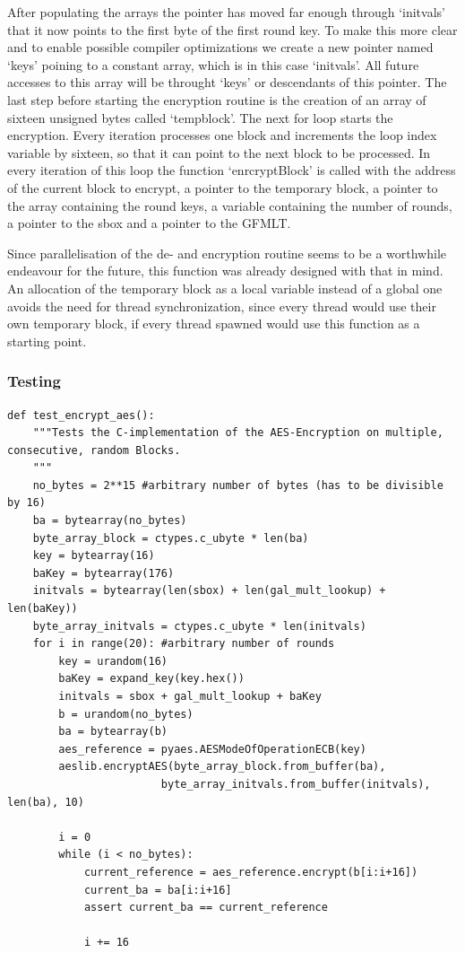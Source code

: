 After populating the arrays the pointer has moved far enough through
`initvals' that it now points to the first byte of the first round key.
To make this more clear and to enable possible compiler optimizations we
create a new pointer named `keys' poining to a constant array, which is
in this case `initvals'. All future accesses to this array will be
throught `keys' or descendants of this pointer. The last step before
starting the encryption routine is the creation of an array of sixteen
unsigned bytes called `tempblock'. The next for loop starts the
encryption. Every iteration processes one block and increments the loop
index variable by sixteen, so that it can point to the next block to be
processed. In every iteration of this loop the function `enrcryptBlock'
is called with the address of the current block to encrypt, a pointer to
the temporary block, a pointer to the array containing the round keys, a
variable containing the number of rounds, a pointer to the sbox and a
pointer to the GFMLT.

Since parallelisation of the de- and encryption routine seems to be a
worthwhile endeavour for the future, this function was already designed
with that in mind. An allocation of the temporary block as a local
variable instead of a global one avoids the need for thread
synchronization, since every thread would use their own temporary block,
if every thread spawned would use this function as a starting point.

\hypertarget{testing-6}{%
\subsubsection{Testing}\label{testing-6}}

\begin{lstlisting}
def test_encrypt_aes():
    """Tests the C-implementation of the AES-Encryption on multiple, consecutive, random Blocks.
    """
    no_bytes = 2**15 #arbitrary number of bytes (has to be divisible by 16)
    ba = bytearray(no_bytes)
    byte_array_block = ctypes.c_ubyte * len(ba)
    key = bytearray(16)
    baKey = bytearray(176)
    initvals = bytearray(len(sbox) + len(gal_mult_lookup) + len(baKey))
    byte_array_initvals = ctypes.c_ubyte * len(initvals)
    for i in range(20): #arbitrary number of rounds
        key = urandom(16)
        baKey = expand_key(key.hex())
        initvals = sbox + gal_mult_lookup + baKey
        b = urandom(no_bytes)
        ba = bytearray(b)
        aes_reference = pyaes.AESModeOfOperationECB(key)
        aeslib.encryptAES(byte_array_block.from_buffer(ba),
                        byte_array_initvals.from_buffer(initvals), len(ba), 10)

        i = 0
        while (i < no_bytes):
            current_reference = aes_reference.encrypt(b[i:i+16])
            current_ba = ba[i:i+16]
            assert current_ba == current_reference

            i += 16
\end{lstlisting}

